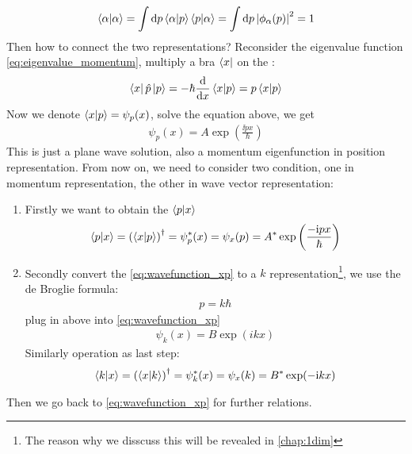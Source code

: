 \begin{align}
    \braket{\alpha|\alpha} = \int \mathrm{d} p \braket{\alpha|p} \braket{p | \alpha} = \int \mathrm{d} p \left| \phi_ \alpha(p) \right|^2 = 1
\end{align}
Then how to connect the two representations? Reconsider the eigenvalue function \cref{eq:eigenvalue_momentum}, multiply a bra $\bra{x}$ on the \lhs: 
\begin{eqnarray}
    \bra{x} \hat{p} \ket{p} = - \hbar \frac{\mathrm{d}}{\mathrm{d} x} \braket{x|p} = p \braket{x|p}
\end{eqnarray}
Now we denote $\braket{x|p} = \psi_p(x)$, solve the equation above, we get 
\begin{align}
    \psi_p(x) = A \exp\left(\frac{\ii p x}{\hbar}\right) \label{eq:wavefunction_xp}
\end{align}
This is just a plane wave solution, also a momentum eigenfunction in position representation. From now on, we need to consider two condition, one in momentum representation, the other in wave vector representation: 
\begin{enumerate}
    \item Firstly we want to obtain the $\braket{p|x}$
    \begin{eqnarray}
        \braket{p|x} = \left(\braket{x|p}\right)^ \dag = \psi^*_p(x) = \psi_x(p) = A^* \exp\left(\frac{- \mathrm{i} p x}{\hbar}\right) \label{eq:wavefunction_px}
    \end{eqnarray}
    \item Secondly convert the \cref{eq:wavefunction_xp} to a $k$ representation\footnote{The reason why we disscuss this will be revealed in \cref{chap:1dim}}, we use the de Broglie formula: 
    \begin{eqnarray}
        p = k \hbar
    \end{eqnarray} 
    plug in above into \cref{eq:wavefunction_xp}
    \begin{eqnarray}
        \psi_k(x) = B \exp({ikx}) 
    \end{eqnarray}
    Similarly operation as last step: 
    \begin{eqnarray}
        \braket{k|x} = \left(\braket{x|k}\right)^ \dag = \psi^*_k(x) = \psi_x(k) = B^* \exp(- \mathrm{i} kx)
    \end{eqnarray}
\end{enumerate}
Then we go back to \cref{eq:wavefunction_xp} for further relations.
